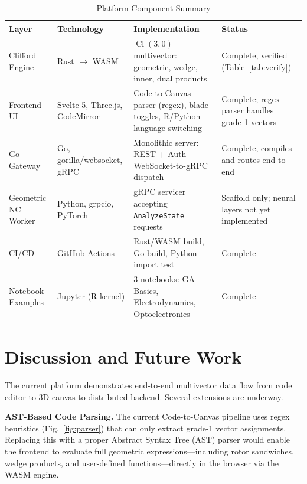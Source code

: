 \documentclass[conference]{IEEEtran}
\begin{document}
\begin{table}[t]
\caption{Platform Component Summary}
\centering
\begin{tabular}{p{3.0cm} p{3.5cm} p{4.0cm} p{4.5cm}}
\toprule
\textbf{Layer} & \textbf{Technology} & \textbf{Implementation} & \textbf{Status} \\
\midrule
Clifford Engine & Rust $\to$ WASM & $\operatorname{Cl}(3,0)$ multivector: geometric, wedge, inner, dual products & Complete, verified (Table~\ref{tab:verify}) \\
\midrule
Frontend UI & Svelte 5, Three.js, CodeMirror & Code-to-Canvas parser (regex), blade toggles, R/Python language switching & Complete; regex parser handles grade-1 vectors \\
\midrule
Go Gateway & Go, gorilla/websocket, gRPC & Monolithic server: REST + Auth + WebSocket-to-gRPC dispatch & Complete, compiles and routes end-to-end \\
\midrule
Geometric NC Worker & Python, grpcio, PyTorch & gRPC servicer accepting \texttt{AnalyzeState} requests & Scaffold only; neural layers not yet implemented \\
\midrule
CI/CD & GitHub Actions & Rust/WASM build, Go build, Python import test & Complete \\
\midrule
Notebook Examples & Jupyter (R kernel) & 3 notebooks: GA Basics, Electrodynamics, Optoelectronics & Complete \\
\bottomrule
\end{tabular}
\label{tab:summary}
\end{table}

\section{Discussion and Future Work}
\label{sec:future}

The current platform demonstrates end-to-end multivector data flow from code editor to 3D canvas to distributed backend. Several extensions are underway.

\textbf{AST-Based Code Parsing.} The current Code-to-Canvas pipeline uses regex heuristics (Fig.~\ref{fig:parser}) that can only extract grade-1 vector assignments. Replacing this with a proper Abstract Syntax Tree (AST) parser would enable the frontend to evaluate full geometric expressions---including rotor sandwiches, wedge products, and user-defined functions---directly in the browser via the WASM engine.
\end{document}
